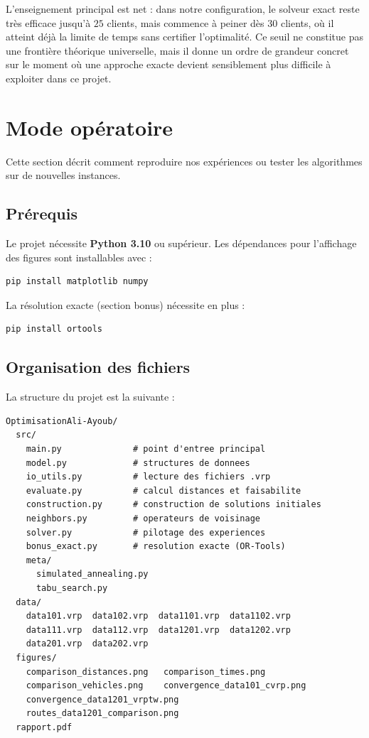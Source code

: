 \documentclass[11pt,a4paper]{article}
\begin{document}
L'enseignement principal est net : dans notre configuration, le solveur exact reste très efficace jusqu'à \(25\) clients, mais commence à peiner dès \(30\) clients, où il atteint déjà la limite de temps sans certifier l'optimalité. Ce seuil ne constitue pas une frontière théorique universelle, mais il donne un ordre de grandeur concret sur le moment où une approche exacte devient sensiblement plus difficile à exploiter dans ce projet.

\section{Mode opératoire}
\label{sec:modeop}

Cette section décrit comment reproduire nos expériences ou tester les algorithmes sur de nouvelles instances.

\subsection{Prérequis}

Le projet nécessite \textbf{Python 3.10} ou supérieur. Les dépendances pour l'affichage des figures sont installables avec :

\begin{lstlisting}
pip install matplotlib numpy
\end{lstlisting}

La résolution exacte (section bonus) nécessite en plus :

\begin{lstlisting}
pip install ortools
\end{lstlisting}

\subsection{Organisation des fichiers}

La structure du projet est la suivante :

\begin{lstlisting}
OptimisationAli-Ayoub/
  src/
    main.py              # point d'entree principal
    model.py             # structures de donnees
    io_utils.py          # lecture des fichiers .vrp
    evaluate.py          # calcul distances et faisabilite
    construction.py      # construction de solutions initiales
    neighbors.py         # operateurs de voisinage
    solver.py            # pilotage des experiences
    bonus_exact.py       # resolution exacte (OR-Tools)
    meta/
      simulated_annealing.py
      tabu_search.py
  data/
    data101.vrp  data102.vrp  data1101.vrp  data1102.vrp
    data111.vrp  data112.vrp  data1201.vrp  data1202.vrp
    data201.vrp  data202.vrp
  figures/
    comparison_distances.png   comparison_times.png
    comparison_vehicles.png    convergence_data101_cvrp.png
    convergence_data1201_vrptw.png
    routes_data1201_comparison.png
  rapport.pdf
\end{lstlisting}
\end{document}

